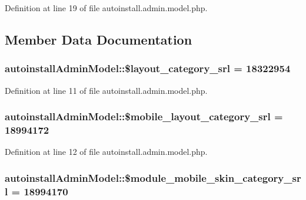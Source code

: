 Definition at line 19 of file autoinstall.\+admin.\+model.\+php.



\subsection{Member Data Documentation}
\hypertarget{classautoinstallAdminModel_ae52a3948ebafbec737741c8bb5a51f68}{}
\subsubsection[{\$layout\+\_\+category\+\_\+srl}]{\setlength{\rightskip}{0pt plus 5cm}autoinstall\+Admin\+Model\+::\$layout\+\_\+category\+\_\+srl = 18322954}\label{classautoinstallAdminModel_ae52a3948ebafbec737741c8bb5a51f68}


Definition at line 11 of file autoinstall.\+admin.\+model.\+php.

\hypertarget{classautoinstallAdminModel_a7dca62f2e0f3e37c6f2562125cd8cf94}{}
\subsubsection[{\$mobile\+\_\+layout\+\_\+category\+\_\+srl}]{\setlength{\rightskip}{0pt plus 5cm}autoinstall\+Admin\+Model\+::\$mobile\+\_\+layout\+\_\+category\+\_\+srl = 18994172}\label{classautoinstallAdminModel_a7dca62f2e0f3e37c6f2562125cd8cf94}


Definition at line 12 of file autoinstall.\+admin.\+model.\+php.

\hypertarget{classautoinstallAdminModel_add26efaa0308b61db15daa951bef678f}{}
\subsubsection[{\$module\+\_\+mobile\+\_\+skin\+\_\+category\+\_\+srl}]{\setlength{\rightskip}{0pt plus 5cm}autoinstall\+Admin\+Model\+::\$module\+\_\+mobile\+\_\+skin\+\_\+category\+\_\+srl = 18994170}\label{classautoinstallAdminModel_add26efaa0308b61db15daa951bef678f}


